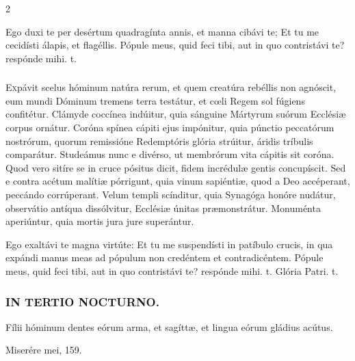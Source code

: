 \documentclass[9pt,twoside]{extarticle}
\begin{document}
\begin{multicols}{2}
\begin{tightlist}{}
\item {} Ego duxi te per desértum quadragínta annis, et manna cibávi te; \textred{*} Et tu me cecidísti álapis, et flagéllis.  Pópule meus, quid feci tibi, aut in quo contristávi te? respónde mihi. t.
\end{tightlist}

\subsubsection*{\center{}}
\lettrine{E}xpávit scelus hóminum natúra rerum, et quem creatúra rebéllis non agnóscit, eum mundi Dóminum tremens terra testátur, et cœli Regem sol fúgiens confitétur. Clámyde coccínea indúitur, quia sánguine Mártyrum suórum Ecclésiæ corpus ornátur. Coróna spínea cápiti ejus impónitur, quia púnctio peccatórum nostrórum, quorum remissióne Redemptóris glória strúitur, áridis tríbulis comparátur. Studeámus nunc e divérso, ut membrórum vita cápitis sit coróna. Quod vero sitíre se in cruce pósitus dicit, fidem incrédulæ gentis concupíscit. Sed e contra acétum malítiæ pórrigunt, quia vinum sapiéntiæ, quod a Deo accéperant, peccándo corrúperant. Velum templi scínditur, quia Synagóga honóre nudátur, observátio antíqua dissólvitur, Ecclésiæ únitas præmonstrátur. Monuménta aperiúntur, quia mortis jura jure superántur.

\begin{tightlist}{}
\item {} Ego exaltávi te magna virtúte: \textred{*} Et tu me suspendísti in patíbulo crucis, in qua expándi manus meas ad pópulum non credéntem et contradicéntem.  Pópule meus, quid feci tibi, aut in quo contristávi te? respónde mihi. t. Glória Patri. t.
\end{tightlist}
\subsubsection*{\center \textsc{IN TERTIO NOCTURNO.}}
\begin{tightlist}{}
\item {} Fílii hóminum dentes eórum arma, et sagíttæ, et lingua eórum gládius acútus. 
\item {} Miserére mei, 159.
\end{tightlist}


\end{multicols}
\end{document}
